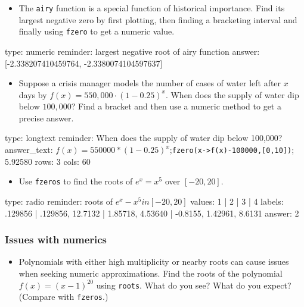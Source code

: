 \documentclass[12pt]{article}
\begin{document}
\begin{itemize}
\itemsep1pt\parskip0pt
\item
  The \texttt{airy} function is a special function of historical
  importance. Find its largest negative zero by first plotting, then
  finding a bracketing interval and finally using \texttt{fzero} to get
  a numeric value.
\end{itemize}

\begin{answer}
    type: numeric
    reminder: largest negative root of airy function
    answer: [-2.338207410459764, -2.3380074104597637]

\end{answer}

\begin{itemize}
\itemsep1pt\parskip0pt
\item
  Suppose a crisis manager models the number of cases of water left
  after $x$ days by $f(x) = 550,000 \cdot (1 - 0.25)^x$. When does the
  supply of water dip below $100,000$? Find a bracket and then use a
  numeric method to get a precise answer.
\end{itemize}

\begin{answer}
type: longtext
reminder: When does the supply of water dip below 100,000?
answer_text: \(f(x) = 550000*(1-0.25)^x\);\verb+fzero(x->f(x)-100000,[0,10])+; 5.92580 
rows: 3
cols: 60
\end{answer}

\begin{itemize}
\itemsep1pt\parskip0pt
\item
  Use \texttt{fzeros} to find the roots of $e^x = x^5$ over $[-20,20]$.
\end{itemize}

\begin{answer}
type: radio
reminder: roots of \( e^x - x^5 in [-20,20] \)
values: 1 | 2 | 3 | 4
labels: .129856 | .129856, 12.7132 | 1.85718, 4.53640 | -0.8155, 1.42961, 8.6131
answer: 2
\end{answer}

\subsubsection{Issues with numerics}

\begin{itemize}
\itemsep1pt\parskip0pt
\item
  Polynomials with either high multiplicity or nearby roots can cause
  issues when seeking numeric approximations. Find the roots of the
  polynomial $f(x) = (x-1)^{20}$ using \texttt{roots}. What do you see?
  What do you expect? (Compare with \texttt{fzeros}.)
\end{itemize}
\end{document}
